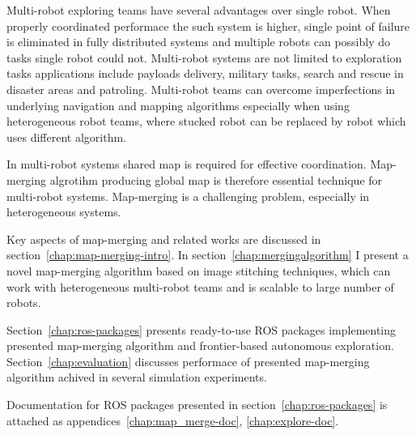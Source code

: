 
Multi-robot exploring teams have several advantages over single robot. When properly coordinated performace the such system is higher, single point of failure is eliminated in fully distributed systems and multiple robots can possibly do tasks single robot could not. Multi-robot systems are not limited to exploration tasks applications include payloads delivery, military tasks, search and rescue in disaster areas and patroling. Multi-robot teams can overcome imperfections in underlying navigation and mapping algorithms especially when using heterogeneous robot teams, where stucked robot can be replaced by robot which uses different algorithm.

In multi-robot systems shared map is required for effective coordination. Map-merging algrotihm producing global map is therefore essential technique for multi-robot systems. Map-merging is a challenging problem, especially in heterogeneous systems.

Key aspects of map-merging and related works are discussed in section~\ref{chap:map-merging-intro}. In section~\ref{chap:mergingalgorithm} I present a novel map-merging algorithm based on image stitching techniques, which can work with heterogeneous multi-robot teams and is scalable to large number of robots.

Section~\ref{chap:ros-packages} presents ready-to-use \gls{ROS} packages implementing presented map-merging algorithm and frontier-based autonomous exploration. Section~\ref{chap:evaluation} discusses performace of presented map-merging algorithm achived in several simulation experiments.

Documentation for \gls{ROS} packages presented in section~\ref{chap:ros-packages} is attached as appendices~\ref{chap:map_merge-doc}, \ref{chap:explore-doc}.
